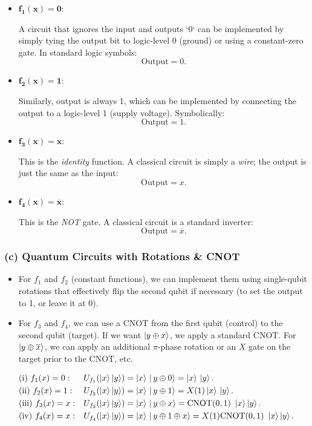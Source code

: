\documentclass[11pt]{article}
\begin{document}
\begin{itemize}
\item \(\boldsymbol{f_1(x) = 0}\):

  A circuit that ignores the input and outputs `0` can be implemented by simply tying the output bit to logic-level 0 (ground) or using a constant-zero gate. In standard logic symbols:
  \[
    \text{Output} = 0.
  \]

\item \(\boldsymbol{f_2(x) = 1}\):

  Similarly, output is always 1, which can be implemented by connecting the output to a logic-level 1 (supply voltage). Symbolically:
  \[
    \text{Output} = 1.
  \]

\item \(\boldsymbol{f_3(x) = x}\):

  This is the \textit{identity} function. A classical circuit is simply a \textit{wire}; the output is just the same as the input:
  \[
    \text{Output} = x.
  \]

\item \(\boldsymbol{f_4(x) = \overline{x}}\):

  This is the \textit{NOT} gate. A classical circuit is a standard inverter:
  \[
    \text{Output} = \overline{x}.
  \]
\end{itemize}

\subsubsection*{(c) Quantum Circuits with Rotations \& CNOT}

\begin{itemize}
\item For \(f_1\) and \(f_2\) (constant functions), we can implement them using single-qubit rotations that effectively flip the second qubit if necessary (to set the output to 1, or leave it at 0).
\item For \(f_3\) and \(f_4\), we can use a \(\mathrm{CNOT}\) from the first qubit (control) to the second qubit (target). If we want \(\ket{y \oplus x}\), we apply a standard CNOT. For \(\ket{y \oplus \overline{x}}\), we can apply an additional \(\pi\)-phase rotation or an \(X\) gate on the target prior to the CNOT, etc.
\end{itemize}

\[
\begin{aligned}
& \text{(i) } f_1(x) = 0: 
  && U_{f_1}(\ket{x}\ket{y})
    = \ket{x}\,\ket{\,y \oplus 0}
    = \ket{x}\,\ket{y}.
  \\
& \text{(ii) } f_2(x) = 1: 
  && U_{f_2}(\ket{x}\ket{y})
    = \ket{x}\,\ket{\,y \oplus 1}
    = X(1)\ket{x}\,\ket{y}.
  \\
& \text{(iii) } f_3(x) = x: 
  && U_{f_3}(\ket{x}\ket{y})
    = \ket{x}\,\ket{\,y \oplus x}
    = \mathrm{CNOT(0,1)}\ \ket{x}\ket{y}.
  \\
& \text{(iv) } f_4(x) = x: 
  && U_{f_4}(\ket{x}\ket{y})
    = \ket{x}\,\ket{\,y \oplus 1 \oplus x}
    = X(1)\mathrm{CNOT(0,1)}\ \ket{x}\ket{y}.
\end{aligned}
\]
\end{document}
